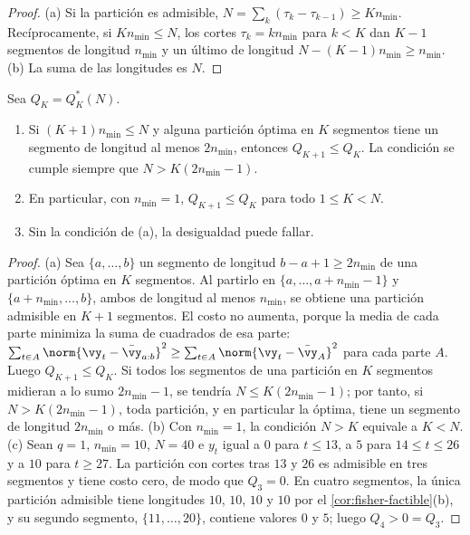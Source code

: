 \begin{proof}
(a) Si la partición es admisible, $N=\sum_k(\tau_k-\tau_{k-1})\ge Kn_{\min}$. Recíprocamente, si
$Kn_{\min}\le N$, los cortes $\tau_k=kn_{\min}$ para $k<K$ dan $K-1$ segmentos de longitud
$n_{\min}$ y un último de longitud $N-(K-1)n_{\min}\ge n_{\min}$. (b) La suma de las longitudes
es $N$.
\end{proof}

\begin{proposicion}\label{prop:fisher-monotonia}
Sea $Q_K=Q^\ast_K(N)$.
\begin{enumerate}[label=(\alph*)]
  \item Si $(K+1)n_{\min}\le N$ y alguna partición óptima en $K$ segmentos tiene un segmento de
    longitud al menos $2n_{\min}$, entonces $Q_{K+1}\le Q_K$. La condición se cumple siempre que
    $N>K(2n_{\min}-1)$.
  \item En particular, con $n_{\min}=1$, $Q_{K+1}\le Q_K$ para todo $1\le K<N$.
  \item Sin la condición de (a), la desigualdad puede fallar.
\end{enumerate}
\end{proposicion}

\begin{proof}
(a) Sea $\{a,\dots,b\}$ un segmento de longitud $b-a+1\ge2n_{\min}$ de una partición óptima en $K$
segmentos. Al partirlo en $\{a,\dots,a+n_{\min}-1\}$ y $\{a+n_{\min},\dots,b\}$, ambos de longitud
al menos $n_{\min}$, se obtiene una partición admisible en $K+1$ segmentos. El costo no aumenta,
porque la media de cada parte minimiza la suma de cuadrados de esa parte:
$\sum_{t\in A}\norm{\vy_t-\bar\vy_{a:b}}^2\ge\sum_{t\in A}\norm{\vy_t-\bar\vy_A}^2$ para cada parte
$A$. Luego $Q_{K+1}\le Q_K$. Si todos los segmentos de una partición en $K$ segmentos midieran a
lo sumo $2n_{\min}-1$, se tendría $N\le K(2n_{\min}-1)$; por tanto, si $N>K(2n_{\min}-1)$, toda
partición, y en particular la óptima, tiene un segmento de longitud $2n_{\min}$ o más.
(b) Con $n_{\min}=1$, la condición $N>K$ equivale a $K<N$. (c) Sean $q=1$, $n_{\min}=10$, $N=40$ e
$y_t$ igual a $0$ para $t\le13$, a $5$ para $14\le t\le26$ y a $10$ para $t\ge27$. La partición
con cortes tras $13$ y $26$ es admisible en tres segmentos y tiene costo cero, de modo que
$Q_3=0$. En cuatro segmentos, la única partición admisible tiene longitudes $10$, $10$, $10$ y
$10$ por el \cref{cor:fisher-factible}(b), y su segundo segmento, $\{11,\dots,20\}$, contiene
valores $0$ y $5$; luego $Q_4>0=Q_3$.
\end{proof}

